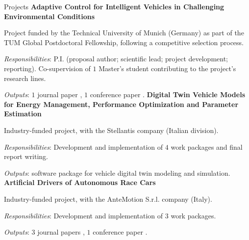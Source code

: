 \begin{rubric}{Projects}
%
\entry*[12/2024 -- 01/2026]%
	\textbf{Adaptive Control for Intelligent Vehicles in Challenging Environmental Conditions}
    \par Project funded by the Technical University of Munich (Germany) as part of the TUM Global Postdoctoral Fellowship, following a competitive selection process.
    \par \textit{Responsibilities}: P.I. (proposal author; scientific lead; project development; reporting). Co-supervision of $1$ Master's student contributing to the project's research lines.
    \par \textit{Outputs}: $1$ journal paper \cite{PiccininiABS2025}, $1$ conference paper \cite{Piccinini_A2RL_2025}.
%
\entry*[01/2024 -- 11/2024]%
	\textbf{Digital Twin Vehicle Models for Energy Management, Performance Optimization and Parameter Estimation}
    \par Industry-funded project, with the Stellantis company (Italian division).
    \par \textit{Responsibilities}: Development and implementation of $4$ work packages and final report writing.
    \par \textit{Outputs}: software package for vehicle digital twin modeling and simulation.
%
\entry*[11/2019 -- 11/2021]%
	\textbf{Artificial Drivers of Autonomous Race Cars} 
    \par Industry-funded project, with the AnteMotion S.r.l. company (Italy).
    \par \textit{Responsibilities}: Development and implementation of $3$ work packages.
    \par \textit{Outputs}: $3$ journal papers \cite{PiccininiARD2024,Piccinini2023b,Piccinini2023}, $1$ conference paper \cite{Pagot2020}.
%
\end{rubric}
